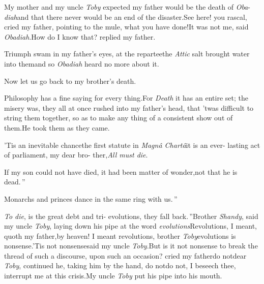 \documentclass{article}
\begin{document}
My mother and my uncle \textit{Toby} expect\-ed my father would be
the death of \textit{Oba}- \textit{diah}\tsk and that there never would be an
end of the disaster.\tsh See here! you rascal, cried my
father, pointing to the mule, what you have done!\tsk It
was not me, said \textit{Obadiah}.\tsk How do I know that?
replied my father.

Triumph swam in my father’s eyes, at the
repartee\tsk the \textit{Attic} salt brought water into
them\tsk and so \textit{Obadiah} heard no more about it.

Now let us go back to my brother’s death.

Philosophy has a fine saying for every thing.\tsk For
\textit{Death} it has an entire set;\break
the misery was, they all at once
rushed into my father’s head, that ’twas difficult to
string them together, so as to make any thing of a consistent show out of them.\tsk He
took them as they came.

\indent\lqq ’Tis an inevitable chance\tsk the first\break
\lqq statute in \textit{Magnâ Chartâ}\tsk it is an ever-
\lqq lasting act of parliament, my dear bro-\break
\lqq ther,\tsk \textit{All must die}.

\indent\lqq If my son could not have died, it\break
\lqq had been matter of wonder,\tsk not that\break
\lqq he is dead.\,”

\indent\lqq Monarchs and princes dance in the\break
\lqq same ring with us.\,”

\indent
\lqq \tsk \textit{To die}, is the great debt and tri-\break
{}\break
{}\break
{}\break
{}\break
{}\break
{}\break
{}\break
{}\break
{}\break
{}\break
{}\break
{}\break
{}
\lqq evolutions, they fall back.\,”\tsk Brother\break
\textit{Shandy}, said my uncle \textit{Toby}, laying down
his pipe at the word \textit{evolutions}\tsk Revolu\-tions, I
meant, quoth my father,\tsk by heaven! I meant revolutions,
brother \textit{Toby}\tsk evolutions is nonsense.\tsk ’Tis
not nonsense\tsk said my uncle \textit{Toby}.\tsh But
is\break
it not nonsense to break the thread of such a discourse, upon
such an occasion? cried my father\tsk do not\tsk dear
\textit{Toby}, continued he, taking him by the hand, do
not\tsk do not, I beseech thee, interrupt me at this
crisis.\tsk My uncle \textit{Toby} put his pipe into his
mouth.
\end{document}
